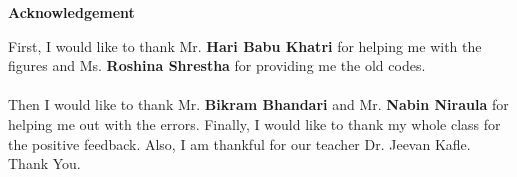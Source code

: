 \begin{center}
  {\LARGE{\bfseries Acknowledgement}}
\end{center}

\vspace{1.5cm}
{\large
  First, I would like to thank Mr. {\bfseries Hari Babu Khatri} for helping me with the figures and Ms. {\bfseries Roshina Shrestha} for providing me the old codes.\\ \\

  Then I would like to thank Mr. {\bfseries Bikram Bhandari} and Mr. {\bfseries Nabin Niraula} for helping me out with the errors. Finally, I would like to thank my whole class for the positive feedback. Also, I am thankful for our teacher Dr. Jeevan Kafle.\\

  Thank You.\\ \\

}
\begin{flushright}
  \theauthor \\
  \thedate
\end{flushright}


\clearpage
